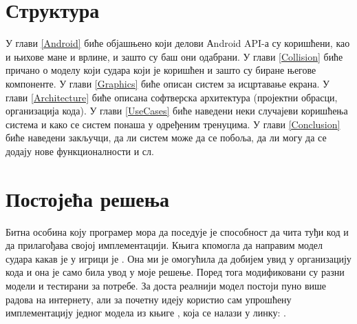\section{Структура}
У глави \ref{Android} биће објашњено који делови Аndroid API-а су коришћени, као и њихове мане и врлине, и зашто су баш они одабрани.
У глави  \ref{Collision} биће причано о моделу који судара који је коришћен и зашто су биране његове компоненте. У глави \ref{Graphics} биће описан систем за исцртавање екрана. У глави \ref{Architecture} биће описана софтверска архитектура (пројектни обрасци, организација кода). У глави \ref{UseCases} биће наведени неки случајеви коришћења система и како се систем понаша у одређеним тренуцима. У глави \ref{Conclusion} биће наведени закључци, да ли систем може да се побоља, да ли могу да се додају нове функционалности и сл.


\section{Постојећа решења}
Битна особина коју програмер мора да поседује је способност да чита туђи код и да прилагођава својој имплементацији. Књига кпомогла да направим модел судара какав је у игрици је \cite{EngBook}. Она ми је омогућила да добијем увид у организацију кода и она је само била увод у моје решење. Поред тога модификовани су разни модели и тестирани за потребе. За доста реалнији модел постоји пуно више радова на интернету, али за почетну идеју користио сам упрошћену имплементацију једног модела из књиге \cite{EngBook}, која се налази у линку: 		\cite{ModCol}.






	
